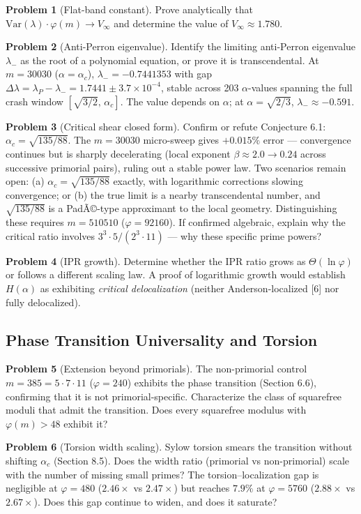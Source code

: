 \documentclass[11pt,letterpaper]{article}
\theoremstyle{definition}
\theoremstyle{remark}
\begin{document}
\textbf{Problem 1} (Flat-band constant). Prove analytically that $\text{Var}(\lambda) \cdot \varphi(m) \to V_\infty$ and determine the value of $V_\infty \approx 1.780$.

\textbf{Problem 2} (Anti-Perron eigenvalue). Identify the limiting anti-Perron eigenvalue $\lambda_-$ as the root of a polynomial equation, or prove it is transcendental. At $m = 30030$ ($\alpha = \alpha_c$), $\lambda_- = -0.7441353$ with gap $\Delta\lambda = \lambda_P - \lambda_- = 1.7441 \pm 3.7 \times 10^{-4}$, stable across 203 $\alpha$-values spanning the full crash window $[\sqrt{3/2},\, \alpha_c]$. The value depends on $\alpha$; at $\alpha = \sqrt{2/3}$, $\lambda_- \approx -0.591$.

\textbf{Problem 3} (Critical shear closed form). Confirm or refute Conjecture 6.1: $\alpha_c = \sqrt{135/88}$. The $m = 30030$ micro-sweep gives $+0.015\%$ error --- convergence continues but is sharply decelerating (local exponent $\beta \approx 2.0 \to 0.24$ across successive primorial pairs), ruling out a stable power law. Two scenarios remain open: (a) $\alpha_c = \sqrt{135/88}$ exactly, with logarithmic corrections slowing convergence; or (b) the true limit is a nearby transcendental number, and $\sqrt{135/88}$ is a PadÃ©-type approximant to the local geometry. Distinguishing these requires $m = 510510$ ($\varphi = 92160$). If confirmed algebraic, explain why the critical ratio involves $3^3 \cdot 5 / (2^3 \cdot 11)$ --- why these specific prime powers?

\textbf{Problem 4} (IPR growth). Determine whether the IPR ratio grows as $\Theta(\ln \varphi)$ or follows a different scaling law. A proof of logarithmic growth would establish $H(\alpha)$ as exhibiting \emph{critical delocalization} (neither Anderson-localized [6] nor fully delocalized).

\subsection{Phase Transition Universality and Torsion}\label{phase-transition-universality-and-torsion}

\textbf{Problem 5} (Extension beyond primorials). The non-primorial control $m = 385 = 5 \cdot 7 \cdot 11$ ($\varphi = 240$) exhibits the phase transition (Section 6.6), confirming that it is not primorial-specific. Characterize the class of squarefree moduli that admit the transition. Does every squarefree modulus with $\varphi(m) > 48$ exhibit it?

\textbf{Problem 6} (Torsion width scaling). Sylow torsion smears the transition without shifting $\alpha_c$ (Section 8.5). Does the width ratio (primorial vs non-primorial) scale with the number of missing small primes? The torsion--localization gap is negligible at $\varphi = 480$ ($2.46\times$ vs $2.47\times$) but reaches $7.9\%$ at $\varphi = 5760$ ($2.88\times$ vs $2.67\times$). Does this gap continue to widen, and does it saturate?
\end{document}
